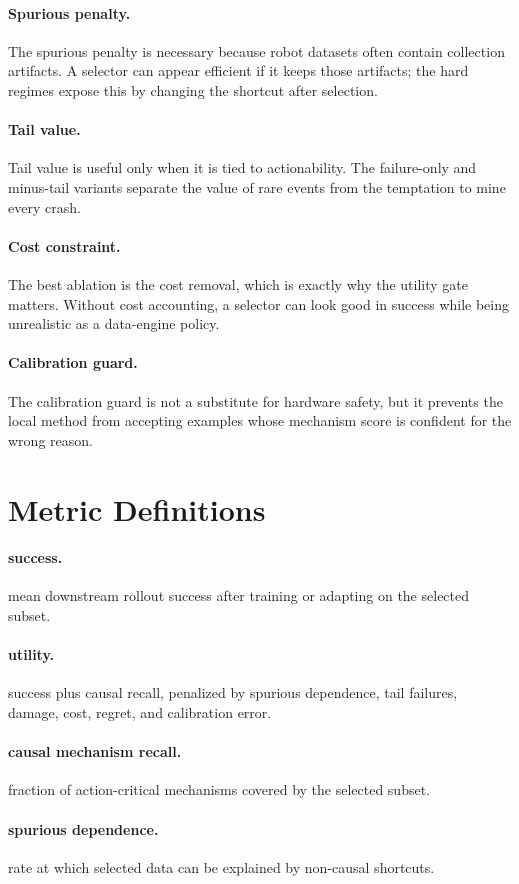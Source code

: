 \documentclass{article}
\begin{document}
\paragraph{Spurious penalty.} The spurious penalty is necessary because robot datasets often contain collection artifacts. A selector can appear efficient if it keeps those artifacts; the hard regimes expose this by changing the shortcut after selection.
\paragraph{Tail value.} Tail value is useful only when it is tied to actionability. The failure-only and minus-tail variants separate the value of rare events from the temptation to mine every crash.
\paragraph{Cost constraint.} The best ablation is the cost removal, which is exactly why the utility gate matters. Without cost accounting, a selector can look good in success while being unrealistic as a data-engine policy.
\paragraph{Calibration guard.} The calibration guard is not a substitute for hardware safety, but it prevents the local method from accepting examples whose mechanism score is confident for the wrong reason.
\clearpage
\section{Metric Definitions}
\paragraph{success.} mean downstream rollout success after training or adapting on the selected subset.
\paragraph{utility.} success plus causal recall, penalized by spurious dependence, tail failures, damage, cost, regret, and calibration error.
\paragraph{causal mechanism recall.} fraction of action-critical mechanisms covered by the selected subset.
\paragraph{spurious dependence.} rate at which selected data can be explained by non-causal shortcuts.
\end{document}
